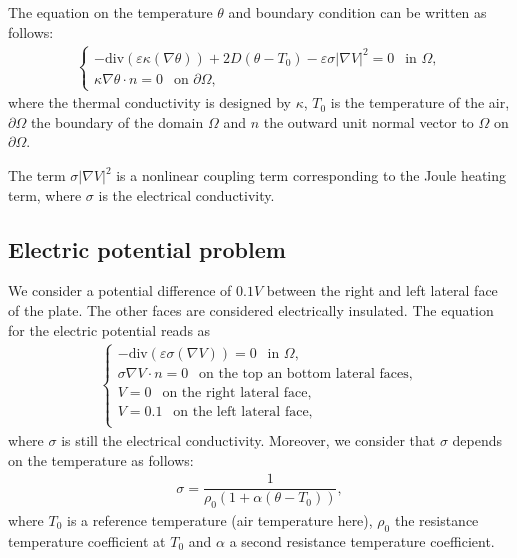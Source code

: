 \documentclass[a4paper,11pt,english]{sphinxmanual}
\begin{document}
\sphinxAtStartPar
The equation on the temperature \(\theta\) and boundary condition can be written as follows:
\begin{equation*}
\begin{split}\left\{\begin{array}{l}
-\mbox{div}(\varepsilon\kappa(\nabla \theta)) + 2D(\theta - T_0) - \varepsilon\sigma|\nabla V|^2 = 0 ~~ \mbox{ in } \Omega, \\
\kappa\nabla \theta \cdot n = 0 ~~ \mbox{ on } \partial \Omega,
\end{array} \right.\end{split}
\end{equation*}
\sphinxAtStartPar
where the thermal conductivity is designed by \(\kappa\), \(T_0\) is the temperature of the air, \(\partial \Omega\) the boundary of the domain \(\Omega\) and \(n\) the outward unit normal vector to \(\Omega\) on \(\partial \Omega\).

\sphinxAtStartPar
The term \(\sigma|\nabla V|^2\) is a nonlinear coupling term corresponding to the Joule heating term, where \(\sigma\) is the electrical conductivity.


\subsection{Electric potential problem}
\label{\detokenize{tutorial/thermo_coupling:electric-potential-problem}}
\sphinxAtStartPar
We consider a potential difference of \(0.1V\) between the right and left lateral face of the plate. The other faces are considered electrically insulated. The equation for the electric potential reads as
\begin{equation*}
\begin{split} \left\{\begin{array}{l}
-\mbox{div}(\varepsilon\sigma(\nabla V)) = 0 ~~ \mbox{ in } \Omega, \\
\sigma\nabla V \cdot n = 0 ~~ \mbox{ on the top an bottom lateral faces}, \\
V = 0 ~~ \mbox{ on the right lateral face}, \\
V = 0.1 ~~ \mbox{ on the left lateral face}, \\
\end{array} \right.\end{split}
\end{equation*}
\sphinxAtStartPar
where \(\sigma\) is still the electrical conductivity. Moreover, we consider that \(\sigma\) depends on the temperature as follows:
\begin{equation*}
\begin{split}\sigma = \dfrac{1}{\rho_0(1+\alpha(\theta - T_0))},\end{split}
\end{equation*}
\sphinxAtStartPar
where \(T_0\) is a reference temperature (air temperature here), \(\rho_0\) the resistance temperature coefficient at \(T_0\) and \(\alpha\) a second resistance temperature coefficient.
\end{document}
